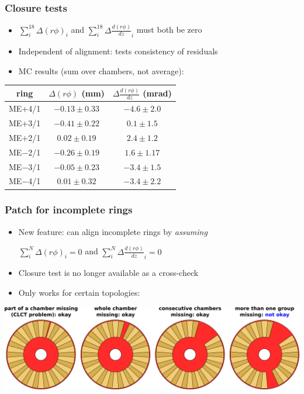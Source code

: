 \documentclass[compress]{beamer}
\begin{document}
\begin{frame}
\frametitle{Closure tests}
\begin{itemize}
\item $\displaystyle \sum_i^{18} \Delta (r\phi)_i$ and $\displaystyle \sum_i^{18} \Delta \frac{d(r\phi)}{dz}_i$ must both be zero
\item Independent of alignment: tests consistency of residuals
\item MC results (sum over chambers, not average):
\end{itemize}

\begin{center}
\renewcommand{\arraystretch}{1.2}
\begin{tabular}{c | c c}
ring & $\Delta (r\phi)$ (mm) & $\Delta \frac{d(r\phi)}{dz}$ (mrad) \\\hline
ME+4/1 & $-0.13 \pm 0.33$ & $-4.6 \pm 2.0$ \\
ME+3/1 & $-0.41 \pm 0.22$ & $0.1 \pm 1.5$ \\
ME+2/1 & $0.02 \pm 0.19$ & $2.4 \pm 1.2$ \\
ME$-$2/1 & $-0.26 \pm 0.19$ & $1.6 \pm 1.17$ \\
ME$-$3/1 & $-0.05 \pm 0.23$ & $-3.4 \pm 1.5$ \\
ME$-$4/1 & $0.01 \pm 0.32$ & $-3.4 \pm 2.2$ \\
\end{tabular}
\end{center}
\end{frame}

\begin{frame}
\frametitle{Patch for incomplete rings}

\begin{itemize}\setlength{\itemsep}{0.25 cm}
\item New feature: can align incomplete rings by {\it assuming}
\begin{center}
$\displaystyle \sum_i^N \Delta (r\phi)_i = 0$ \hspace{0.5 cm}and\hspace{0.5 cm} $\displaystyle \sum_i^N \Delta \frac{d(r\phi)}{dz}_i = 0$
\end{center}

\item Closure test is no longer available as a cross-check

\item Only works for certain topologies:
\end{itemize}

\vfill
\includegraphics[width=\linewidth]{incomplete_rings.pdf}
\end{frame}
\end{document}
